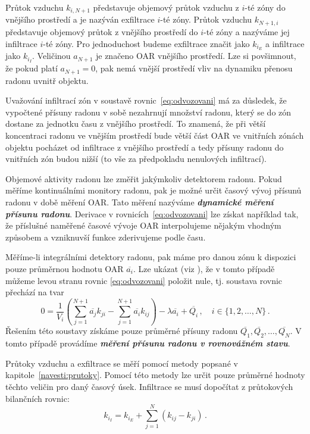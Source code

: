 Průtok vzduchu $k_{i,N+1}$ představuje objemový průtok vzduchu z $i$-té zóny do vnějšího prostředí a je nazýván exfiltrace $i$-té zóny. Průtok vzduchu $k_{N+1, i}$ představuje objemový průtok z vnějšího prostředí do $i$-té zóny a nazýváme jej infiltrace $i$-té zóny. Pro jednoduchost budeme exfiltrace značit jako $k_{i_E}$ a infiltrace jako $k_{i_I}$. Veličinou $a_{N+1}$ je značeno OAR vnějšího prostředí. Lze si povšimnout, že pokud platí $a_{N+1}=0$, pak nemá vnější prostředí vliv na dynamiku přenosu radonu uvnitř objektu.

Uvažování infiltrací zón v soustavě rovnic~\eqref{eq:odvozovani} má za důsledek, že vypočtené přísuny radonu v sobě nezahrnují množství radonu, který se do zón dostane za jednotku času z vnějšího prostředí. To znamená, že při větší koncentraci radonu ve vnějším prostředí bude větší část OAR ve vnitřních zónách objektu pocházet od infiltrace z vnějšího prostředí a tedy přísuny radonu do vnitřních zón budou nižší (to vše za předpokladu nenulových infiltrací).

Objemové aktivity radonu lze změřit jakýmkoliv detektorem radonu. Pokud měříme kontinuálními monitory radonu, pak je možné určit časový vývoj přísunů radonu v době měření OAR. Tato měření nazýváme \emph{\textbf{dynamické měření přísunu radonu}}. Derivace v rovnicích~\eqref{eq:odvozovani} lze získat například tak, že příslušné naměřené časové vývoje OAR interpolujeme nějakým vhodným způsobem a vzniknuvší funkce zderivujeme podle času.

Měříme-li integrálními detektory radonu, pak máme pro danou zónu k dispozici pouze průměrnou hodnotu OAR $\overline{a_i}$. Lze ukázat (viz \cite{japonci2}), že v tomto případě můžeme levou stranu rovnic \eqref{eq:odvozovani} položit nule, tj. soustava rovnic přechází na tvar 
\begin{equation}
    0=\frac{1}{V_i}\left( \sum^{N+1}_{j=1}\overline{a_j} k_{ji}-\sum^{N+1}_{j=1}\overline{a_i} k_{ij}\right)-\lambda \overline{a_i} +\overline{Q_i}\,,\quad i\in \{1,2,\ldots,N\}\,.\label{eq:odvozovani_rovnovaha}
\end{equation}
Řešením této soustavy získáme pouze průměrné přísuny radonu $\overline{Q_1}, \overline{Q_2}, \ldots, \overline{Q_N}$. V tomto případě provádíme \emph{\textbf{měření přísunu radonu v rovnovážném stavu}}.

Průtoky vzduchu a exfiltrace se měří pomocí metody popsané v kapitole~\ref{navesti:prutoky}. Pomocí této metody lze určit pouze průměrné hodnoty těchto veličin pro daný časový úsek. Infiltrace se musí dopočítat z průtokových bilančních rovnic:
\begin{equation}
k_{i_I}=k_{i_E}+\sum_{j=1}^{N} \left(k_{ij}-k_{ji}\right)\,.
    \label{eq:infiltrace}
\end{equation}

